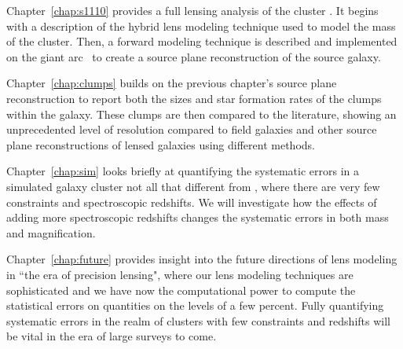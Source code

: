 Chapter~\ref{chap:s1110} provides a full lensing analysis of the cluster \cluster. It begins with a description of the hybrid lens modeling technique used to model the mass of the cluster. Then, a forward modeling technique is described and implemented on the giant arc \giantarc\ to create a source plane reconstruction of the source galaxy.

Chapter~\ref{chap:clumps} builds on the previous chapter's source plane reconstruction to report both the sizes and star formation rates of the clumps within the galaxy. These clumps are then compared to the literature, showing an unprecedented level of resolution compared to field galaxies and other source plane reconstructions of lensed galaxies using different methods.

Chapter~\ref{chap:sim} looks briefly at quantifying the systematic errors in a simulated galaxy cluster not all that different from \cluster, where there are very few constraints and spectroscopic redshifts. We will investigate how the effects of adding more spectroscopic redshifts changes the systematic errors in both mass and magnification.

Chapter~\ref{chap:future} provides insight into the future directions of lens modeling in ``the era of precision lensing", where our lens modeling techniques are sophisticated and we have now the computational power to compute the statistical errors on quantities on the levels of a few percent. Fully quantifying systematic errors in the realm of clusters with few constraints and redshifts will be vital in the era of large surveys to come.






